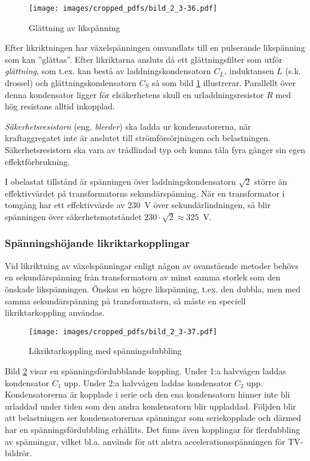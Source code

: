 \begin{figure}
\texttt{[image: images/cropped\_pdfs/bild\_2\_3-36.pdf]}
\caption{Glättning av likspänning}
\label{fig:BildII3-36}
\end{figure}

Efter likriktningen har växelspänningen omvandlats till en pulserande
likspänning som kan ''glättas''.
Efter likriktarna ansluts då ett glättningsfilter som utför \emph{glättning},
som t.ex. kan bestå av laddningskondensatorn \(C_L\), induktansen \(L\) (s.k.
drossel) och glättningskondensatorn \(C_S\) så som bild \ref{fig:BildII3-36}
illustrerar.
Parallellt över denna kondensator ligger för elsäkerhetens skull en
urladdningsresistor \(R\) med hög resistans alltid inkopplad.

\emph{Säkerhetsresistorn}  (eng. \emph{bleeder}) ska ladda ur kondensatorerna,
när kraftaggregatet inte är anslutet till strömförsörjningen och belastningen.
Säkerhetsresistorn ska vara av trådlindad typ och kunna tåla fyra gånger sin
egen effektförbrukning.

I obelastat tillstånd är spänningen över laddningskondensatorn \(\sqrt{2}\)
större än effektivvärdet på transformatorns sekundärspänning.
När en transformator i tomgång har ett effektivvärde av 230~V över
sekundärlindningen, så blir spänningen över säkerhetsmotståndet
\(230\cdot\sqrt{2} \approx 325\)~V.

\subsubsection{Spänningshöjande likriktarkopplingar}

Vid likriktning av växelspänningar enligt någon av ovanstående metoder behövs
en sekundärspänning från transformatorn av minst samma storlek som den önskade
likspänningen.
Önskas en högre likspänning, t.ex. den dubbla, men med samma sekundärspänning
på transformatorn, så måste en speciell likriktarkoppling användas.

\begin{figure}
\texttt{[image: images/cropped\_pdfs/bild\_2\_3-37.pdf]}
\caption{Likriktarkoppling med spänningsdubbling}
\label{fig:BildII3-37}
\end{figure}

Bild \ref{fig:BildII3-37} visar en spänningsfördubblande koppling.
Under 1:a halvvågen laddas kondensator \(C_1\) upp.
Under 2:a halvvågen laddas kondensator \(C_2\) upp.
Kondensatorerna är kopplade i serie och den ena kondensatorn hinner inte bli
urladdad under tiden som den andra kondensatorn blir uppladdad.
Följden blir att belastningen ser kondensatorernas spänningar som seriekopplade
och därmed har en spänningsfördubbling erhållits.
Det finns även kopplingar för flerdubbling av spänningar, vilket bl.a. används
för att alstra accelerationsspänningen för TV-bildrör.

